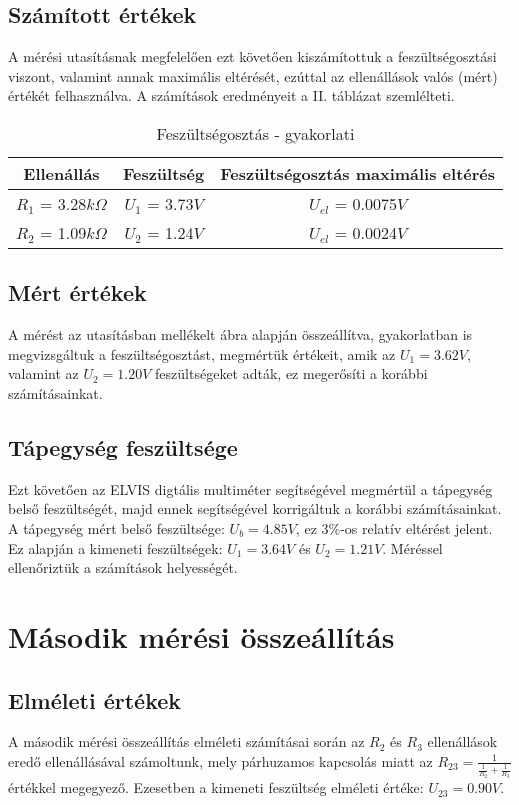 \documentclass[10pt, conference,a4paper]{ITKproc}
\begin{document}
\subsection{Számított értékek}
A mérési utasításnak megfelelően ezt követően kiszámítottuk a feszültségosztási viszont, valamint annak maximális eltérését, ezúttal az ellenállások valós (mért) értékét felhasználva. A számítások eredményeit a II. táblázat szemlélteti.

\begin{table}[ht!]
\renewcommand{\arraystretch}{1.3}
\caption{Feszültségosztás - gyakorlati}
\centering
\begin{tabular}{c||c||c}
\hline
\bfseries Ellenállás & \bfseries Feszültség & \bfseries Feszültségosztás maximális eltérés\\
\hline\hline
 $R_1$ = 3.28$k\Omega$ & $U_1$ = 3.73$V$  & $U_{el}$ = 0.0075$V$\\
\hline
 $R_2$ = 1.09$k\Omega$ & $U_2$ = 1.24$V$  & $U_{el}$ = 0.0024$V$\\
\hline
\end{tabular}
\end{table}

\subsection{Mért értékek}
A mérést az utasításban mellékelt ábra alapján összeállítva, gyakorlatban is megvizsgáltuk a feszültségosztást, megmértük értékeit, amik az $U_1 = 3.62 V$, valamint az $U_2 = 1.20 V$ feszültségeket adták, ez megerősíti a korábbi számításainkat.  

\subsection{Tápegység feszültsége}
Ezt követően az ELVIS digtális multiméter segítségével megmértül a tápegység belső feszültségét, majd ennek segítségével korrigáltuk a korábbi számításainkat. A tápegység mért belső feszültsége: $U_{b} = 4.85 V$, ez 3\%-os relatív eltérést jelent. Ez alapján a kimeneti feszültségek: $U_1 = 3.64 V$ és $U_2 = 1.21 V$. Méréssel ellenőriztük a számítások helyességét. 

\section{Második mérési összeállítás}
\subsection{Elméleti értékek}
A második mérési összeállítás elméleti számításai során az $R_2$ és $R_3$ ellenállások eredő ellenállásával számoltunk, mely párhuzamos kapcsolás miatt az $R_{23} = \frac{1}{\frac{1}{R_2} + \frac{1}{R_3}}$ értékkel megegyező. Ezesetben a kimeneti feszültség elméleti értéke: $U_{23} = 0.90 V$. 
\end{document}
